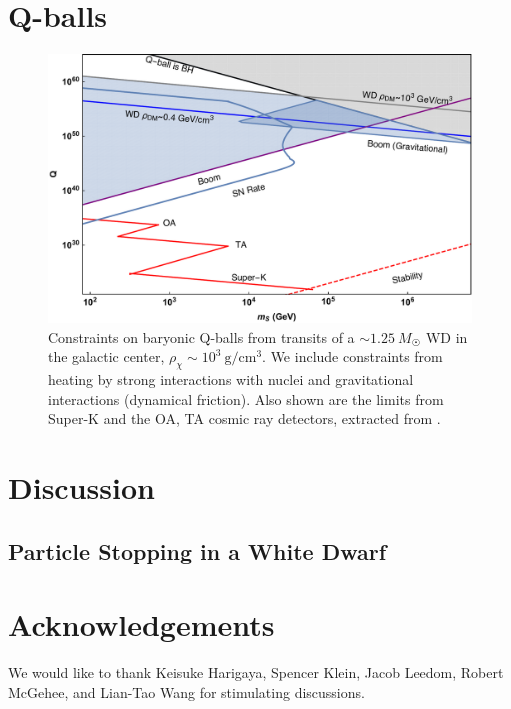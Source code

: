 \documentclass[twocolumn, preprintnumbers,amsmath,amssymb,prd, superscriptaddress]{revtex4}
\begin{document}
\section{Q-balls}
\label{sec:qballs}


\begin{figure}
\includegraphics[scale=.3]{Qballconstraint.pdf}
\caption{Constraints on baryonic Q-balls from transits of a $\sim 1.25 ~M_{\astrosun}$ WD in the galactic center, $\rho_\chi \sim 10^3 ~\text{g}/\text{cm}^3$.
We include constraints from heating by strong interactions with nuclei and gravitational interactions (dynamical friction).
Also shown are the limits from Super-K and the OA, TA cosmic ray detectors, extracted from \cite{Dine:2003ax}.}
\label{fig:Qballconstraint}
\end{figure}

\section{Discussion}
\label{sec:discussion}


\begin{appendices}
\section{Particle Stopping in a White Dwarf}
\label{sec:wdpdg}

\end{appendices}

\section*{Acknowledgements}
We would like to thank Keisuke Harigaya, Spencer Klein, Jacob Leedom, Robert McGehee, and Lian-Tao Wang for stimulating discussions.

\begin{thebibliography}{99}


\end{thebibliography}
\end{document}
